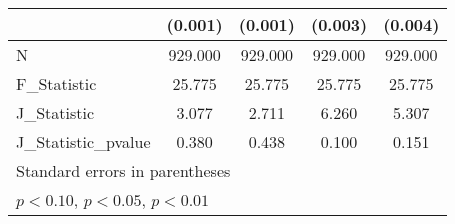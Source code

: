 {\begin{tabular}{l*{4}{c}}
            &     (0.001)         &     (0.001)         &     (0.003)         &     (0.004)         \\
\hline
N           &     929.000         &     929.000         &     929.000         &     929.000         \\
F\_Statistic &      25.775         &      25.775         &      25.775         &      25.775         \\
J\_Statistic &       3.077         &       2.711         &       6.260         &       5.307         \\
J\_Statistic\_pvalue&       0.380         &       0.438         &       0.100         &       0.151         \\
\hline\hline
\multicolumn{5}{l}{\footnotesize Standard errors in parentheses}\\
\multicolumn{5}{l}{\footnotesize \sym{*} \(p<0.10\), \sym{**} \(p<0.05\), \sym{***} \(p<0.01\)}\\
\end{tabular}
}
